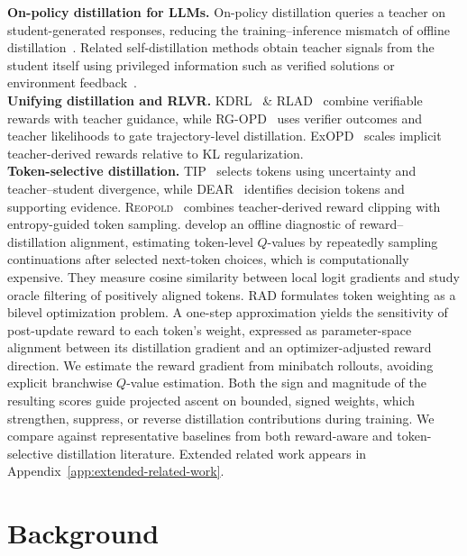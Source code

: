 \documentclass{article} %
\begin{document}
\noindent\textbf{On-policy distillation for LLMs.}\enspace
On-policy distillation queries a teacher on student-generated responses, reducing the training--inference mismatch of offline distillation~\citep{agarwal2024policy,gu2024minillm}. Related self-distillation methods obtain teacher signals from the student itself using privileged information such as verified solutions or environment feedback~\citep{shenfeld2026self,hubotter2026reinforcement,zhao2026self}.\\
\noindent\textbf{Unifying distillation and RLVR.}\enspace
KDRL~\citep{xu2025kdrl} \& RLAD~\citep{zhang2026reinforcement} combine verifiable rewards with teacher guidance, while RG-OPD~\citep{rgopd} uses verifier outcomes and teacher likelihoods to gate trajectory-level distillation. ExOPD~\citep{yang2026learning} scales implicit teacher-derived rewards relative to KL regularization. \\
\noindent\textbf{Token-selective distillation.}\enspace
TIP~\citep{xu2026tip} selects tokens using uncertainty and teacher--student divergence, while DEAR~\citep{xiao2026finding} identifies decision tokens and supporting evidence. \textsc{Reopold}~\citep{ko2026scalingreasoningefficientlyrelaxed} combines teacher-derived reward clipping with entropy-guided token sampling. 
\citet{armandpour2026unmasking} develop an offline diagnostic of
reward--distillation alignment, estimating token-level $Q$-values 
by repeatedly sampling continuations after selected next-token choices,
which is computationally expensive. They measure
cosine similarity between local logit gradients and study oracle
filtering of positively aligned tokens.
RAD formulates token weighting as a bilevel optimization problem.
A one-step approximation yields the sensitivity of post-update reward
to each token's weight, expressed as parameter-space alignment between
its distillation gradient and an optimizer-adjusted reward direction.
We estimate the reward gradient from minibatch rollouts, avoiding
explicit branchwise $Q$-value estimation. Both the sign and magnitude
of the resulting scores guide projected ascent on bounded, signed
weights, which strengthen, suppress, or reverse distillation
contributions during training.
We compare against representative baselines from both reward-aware and token-selective distillation literature. 
Extended related work appears in Appendix~\ref{app:extended-related-work}.

\section{Background}
\label{sec:background}
\end{document}
